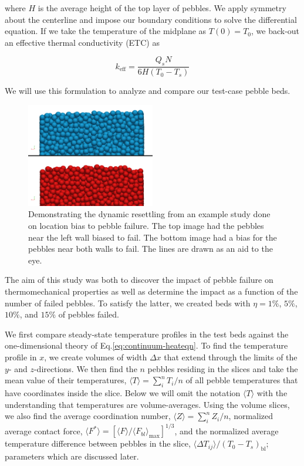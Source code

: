 where $H$ is the average height of the top layer of pebbles. We apply symmetry about the centerline and impose our boundary conditions to solve the differential equation. If we take the temperature of the midplane as $T(0) = T_0$, we back-out an effective thermal conductivity (ETC) as

\begin{equation}\label{eq:etc}
	k_\text{eff} = \frac{Q_sN}{6H(T_0-T_s)}
\end{equation}


We will use this formulation to analyze and compare our test-case pebble beds.



\begin{figure}[htbp]
	\centering
	\includegraphics[width=0.5\textwidth]{chapters/figures/settlingStudy}
	\caption{Demonstrating the dynamic resettling from an example study done on location bias to pebble failure. The top image had the pebbles near the left wall biased to fail. The bottom image had a bias for the pebbles near both walls to fail. The lines are drawn as an aid to the eye.}
\label{fig:settlingStudy}
\end{figure}


The aim of this study was both to discover the impact of pebble failure on thermomechanical properties as well as determine the impact as a function of the number of failed pebbles. To satisfy the latter, we created beds with $\eta = 1\%$, $5\%$, $10\%$, and $15\%$ of pebbles failed. 

We first compare steady-state temperature profiles in the test beds against the one-dimensional theory of Eq.\ref{eq:continuum-heateqn}. To find the temperature profile in $x$, we create volumes of width $\Delta x$ that extend through the limits of the $y$- and $z$-directions. We then find the $n$ pebbles residing in the slices and take the mean value of their temperatures, $\langle T\rangle = \sum_{i}^n T_i / n$ of all pebble temperatures that have coordinates inside the slice. Below we will omit the notation $\langle T \rangle$ with the understanding that temperatures are volume-averages. Using the volume slices, we also find the average coordination number, $\langle Z \rangle = \sum_{i}^n Z_i / n$, normalized average contact force, $\langle F^* \rangle=\left[\langle F \rangle/\langle F_{bl} \rangle_\text{max}\right]^{1/3}$, and the normalized average temperature difference between pebbles in the slice, $\langle \Delta T_{ij} \rangle / (T_0 - T_s)_\text{bl}$; parameters which are discussed later.

